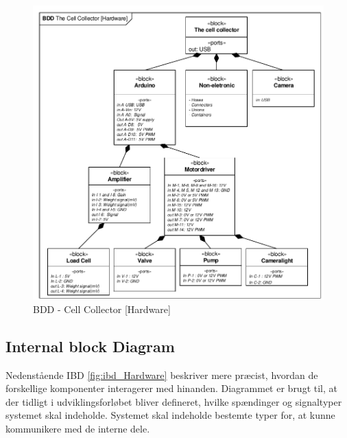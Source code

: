 \begin{figure}[H]
	\centering
	\includegraphics[width=1\textwidth]{pdf/BDD_Hardware.pdf}
	\caption{BDD - Cell Collector [Hardware]}
	\label{fig:bdd_Hardware}
\end{figure}
	
\newpage
\subsection{Internal block Diagram} 
Nedenstående IBD \ref{fig:ibd_Hardware} beskriver mere præcist, hvordan de forskellige komponenter interagerer med hinanden. Diagrammet er brugt til, at der tidligt i udviklingsforløbet bliver defineret, hvilke spændinger og signaltyper systemet skal indeholde. Systemet skal indeholde bestemte typer for, at kunne kommunikere med de interne dele.


